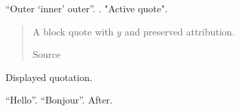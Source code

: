 \documentclass{article}
\begin{document}
\enquote{Outer \enquote{inner} outer}.
.
"Active quote".
\blockquote[Source]{A block quote with $y$ and preserved attribution.}
\begin{displayquote}[Source]Displayed quotation.\end{displayquote}
\foreignquote{english}{Hello}. {\enquote{Bonjour}.}
After.
\end{document}
